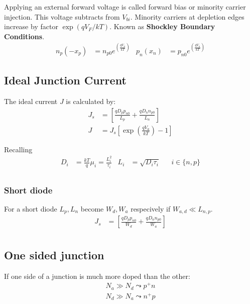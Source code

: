 \documentclass[a4paper, fontsize=8pt, landscape, DIV=1]{scrartcl}
\begin{document}
\begin{multicols*}{4}
    Applying an external forward voltage is called forward bias or minority carrier injection.
    This voltage subtracts from $V_{bi}$.
    Minority carriers at depletion edges increase by factor $\exp(qV_F/kT)$.
    Known as \textbf{Shockley Boundary Conditions}.
    \begin{align*}
      n_p(-x_p) &= n_{p0}e^{\left(\frac{qV_a}{kT}\right)} & p_n(x_n) &= p_{n0}e^{\left(\frac{qV_a}{kT}\right)}
    \end{align*}
     

  \subsection{Ideal Junction Current}
    The ideal current $J$ is calculated by:
    \begin{align*}
      J_s &= \left[ \frac{qD_pp_{n0}}{L_p} + \frac{qD_nn_{p0}}{L_n} \right] \\
      J   &= J_s \left[ \exp\left(\frac{qV_a}{kT}\right) -1 \right] 
    \end{align*}
    
    Recalling
    \begin{align*}
      D_i &= \frac{kT}{q}\mu_i = \frac{L_i^2}{\tau_i} & L_i&=\sqrt{D_i\tau_i} & &i\in\{n,p\}\\
    \end{align*}

    \subsubsection{Short diode}
    For a short diode $L_p,L_n$ become $W_d, W_a$ respecively if $W_{a,d} \ll L_{n,p}$.
    \begin{align*}
      J_s &= \left[ \frac{qD_pp_{n0}}{W_d} + \frac{qD_nn_{p0}}{W_a} \right] \\
    \end{align*}


    \subsection{One sided junction}
    If one side of a junction is much more doped than the other:
    \begin{align*}
      N_a \gg N_d \leadsto p^+n  \\
      N_d \gg N_a \leadsto n^+p  \\
    \end{align*}


\end{multicols*}
\end{document}
